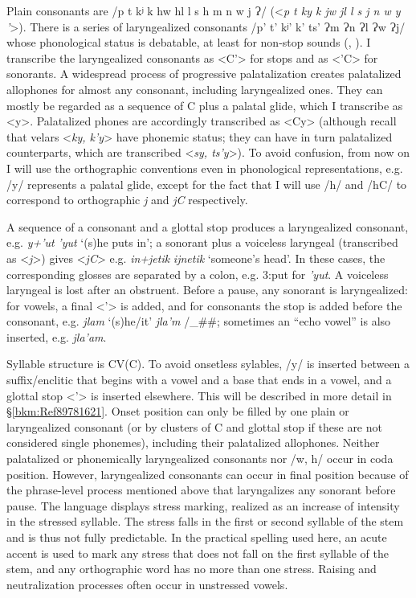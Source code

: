 \documentclass[output=paper]{langscibook}
\begin{document}
Plain consonants are /p t kʲ k hw hl l s h m n w j Ɂ/ (<\textit{p t ky k jw jl l s j n w y '}>). There is a series of laryngealized consonants /p' t' kʲ' k' ts' Ɂm Ɂn Ɂl Ɂw Ɂj/ whose phonological status is debatable, at least for non{}-stop sounds (\citealt{Carol2014fon}, \citealt{GutierezNercesian2021}). I transcribe the laryngealized consonants as <C'> for stops and as <'C> for sonorants. A widespread process of progressive palatalization creates palatalized allophones for almost any consonant, including laryngealized ones. They can mostly be regarded as a sequence of C plus a palatal glide, which I transcribe as <y>. Palatalized phones are accordingly transcribed as <Cy> (although recall that velars <\textit{ky, k'y}> have phonemic status; they can have in turn palatalized counterparts, which are transcribed <\textit{sy, ts'y}>). To avoid confusion, from now on I will use the orthographic conventions even in phonological representations, e.g. /y/ represents a palatal glide, except for the fact that I will use /h/ and /hC/ to correspond to orthographic \textit{j} and \textit{jC} respectively.

A sequence of a consonant and a glottal stop produces a laryngealized consonant, e.g. \textit{y+'ut} \MVRightarrow{} \textit{'yut} `(s)he puts in'; a sonorant plus a voiceless laryngeal (transcribed as <\textit{j}>) gives <\textit{jC}> e.g. \textit{in+jetik} \MVRightarrow{} \textit{ijnetik} `someone's head'. In these cases, the corresponding glosses are separated by a colon, e.g. 3:put for \textit{'yut}. A voiceless laryngeal is lost after an obstruent. Before a pause, any sonorant is laryngealized: for vowels, a final <'> is added, and for consonants the stop is added before the consonant, e.g. \textit{jlam} `(s)he/it' \MVRightarrow{} \textit{jla'm} /\_\#\#; sometimes an ``echo vowel'' is also inserted, e.g. \textit{jla'am}.

Syllable structure is CV(C). To avoid onsetless sylables, /y/ is inserted between a suffix/enclitic that begins with a vowel and a base that ends in a vowel, and a glottal stop  <'> is inserted elsewhere. This will be described in more detail in §\ref{bkm:Ref89781621}. Onset position can only be filled by one plain or laryngealized consonant (or by clusters of C and glottal stop if these are not considered single phonemes), including their palatalized allophones. Neither palatalized or phonemically laryngealized consonants nor /w, h/ occur in coda position. However, laryngealized consonants can occur in final position because of the phrase-level process mentioned above that laryngalizes any sonorant before pause. The language displays stress marking, realized as an increase of intensity in the stressed syllable. The stress falls in the first or second syllable of the stem and is thus not fully predictable. In the practical spelling used here, an acute accent is used to mark any stress that does not fall on the first syllable of the stem, and any orthographic word has no more than one stress. Raising and neutralization processes often occur in unstressed vowels.
\end{document}
